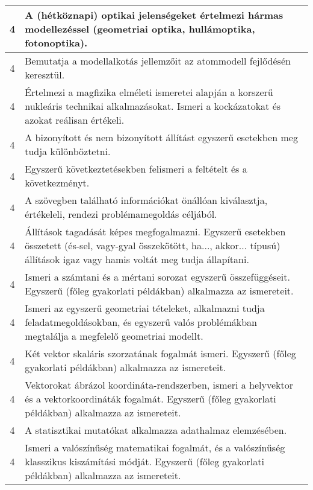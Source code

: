 \begin{longtable}{c | p{12cm} }
                                
                                          4 &  A (hétköznapi) optikai jelenségeket értelmezi hármas modellezéssel (geometriai optika, hullámoptika, fotonoptika). \\ \hline
                                          4 &  Bemutatja a modellalkotás jellemzőit az atommodell fejlődésén keresztül. \\ \hline
                                          4 &  Értelmezi a magfizika elméleti ismeretei alapján a korszerű nukleáris technikai alkalmazásokat. Ismeri a kockázatokat és azokat reálisan értékeli. \\ \hline
                                          4 &  A bizonyított és nem bizonyított állítást egyszerű esetekben meg tudja különböztetni. \\ \hline
                                          4 &  Egyszerű következtetésekben felismeri a feltételt és a következményt. \\ \hline
                                          4 &  A szövegben található információkat önállóan kiválasztja, értékeleli, rendezi problémamegoldás céljából. \\ \hline
                                          4 &  Állítások tagadását képes megfogalmazni. Egyszerű esetekben összetett (és-sel, vagy-gyal összekötött, ha..., akkor... típusú) állítások igaz vagy hamis voltát meg tudja állapítani. \\ \hline
                                          4 &  Ismeri a számtani és a mértani sorozat egyszerű összefüggéseit. Egyszerű (főleg gyakorlati példákban) alkalmazza az ismereteit. \\ \hline
                                          4 &  Ismeri az egyszerű geometriai tételeket, alkalmazni tudja feladatmegoldásokban, és egyszerű valós problémákban megtalálja a megfelelő geometriai modellt. \\ \hline
                                          4 &  Két vektor skaláris szorzatának fogalmát ismeri.  Egyszerű (főleg gyakorlati példákban) alkalmazza az ismereteit. \\ \hline
                                          4 &  Vektorokat ábrázol koordináta-rendszerben, ismeri a helyvektor és a vektorkoordináták fogalmát. Egyszerű (főleg gyakorlati példákban) alkalmazza az ismereteit. \\ \hline
                                          4 &  A statisztikai mutatókat alkalmazza adathalmaz elemzésében. \\ \hline
                                          4 &  Ismeri a valószínűség matematikai fogalmát, és a valószínűség klasszikus kiszámítási módját. Egyszerű (főleg gyakorlati példákban) alkalmazza az ismereteit. \\ \hline

\end{longtable}
